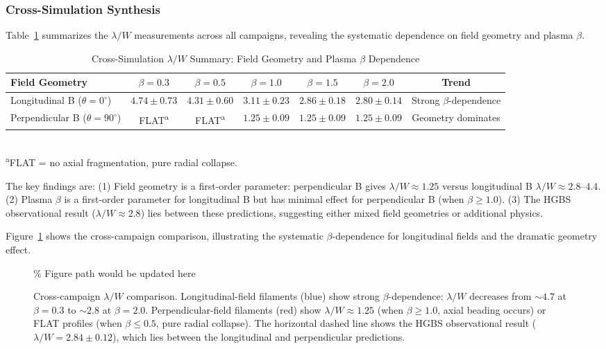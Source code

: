 \documentclass[twoside,twocolumn]{mnras}
\begin{document}
\subsubsection{Cross-Simulation Synthesis}

Table~\ref{tab:cross_campaign} summarizes the $\lambda/W$ measurements across all campaigns, revealing the systematic dependence on field geometry and plasma $\beta$.

\begin{table}
\caption{Cross-Simulation $\lambda/W$ Summary: Field Geometry and Plasma $\beta$ Dependence}
\label{tab:cross_campaign}
\small
\begin{tabular}{lcccccc}
\toprule
Field Geometry & $\beta = 0.3$ & $\beta = 0.5$ & $\beta = 1.0$ & $\beta = 1.5$ & $\beta = 2.0$ & Trend \\
\midrule
Longitudinal B ($\theta = 0^\circ$) & $4.74 \pm 0.73$ & $4.31 \pm 0.60$ & $3.11 \pm 0.23$ & $2.86 \pm 0.18$ & $2.80 \pm 0.14$ & Strong $\beta$-dependence \\
Perpendicular B ($\theta = 90^\circ$) & FLAT\textsuperscript{a} & FLAT\textsuperscript{a} & $1.25 \pm 0.09$ & $1.25 \pm 0.09$ & $1.25 \pm 0.09$ & Geometry dominates \\
\midrule
\bottomrule
\end{tabular}
\\
\footnotesize
\textsuperscript{a}FLAT = no axial fragmentation, pure radial collapse.
\end{table}

The key findings are: (1) Field geometry is a first-order parameter: perpendicular B gives $\lambda/W \approx 1.25$ versus longitudinal B $\lambda/W \approx 2.8$--$4.4$. (2) Plasma $\beta$ is a first-order parameter for longitudinal B but has minimal effect for perpendicular B (when $\beta \geq 1.0$). (3) The HGBS observational result ($\lambda/W \approx 2.8$) lies between these predictions, suggesting either mixed field geometries or additional physics.

Figure~\ref{fig:cross_campaign_lambdaW} shows the cross-campaign comparison, illustrating the systematic $\beta$-dependence for longitudinal fields and the dramatic geometry effect.

\begin{figure}
\% Figure path would be updated here
\caption{Cross-campaign $\lambda/W$ comparison. Longitudinal-field filaments (blue) show strong $\beta$-dependence: $\lambda/W$ decreases from $\sim4.7$ at $\beta = 0.3$ to $\sim2.8$ at $\beta = 2.0$. Perpendicular-field filaments (red) show $\lambda/W \approx 1.25$ (when $\beta \geq 1.0$, axial beading occurs) or FLAT profiles (when $\beta \leq 0.5$, pure radial collapse). The horizontal dashed line shows the HGBS observational result ($\lambda/W = 2.84 \pm 0.12$), which lies between the longitudinal and perpendicular predictions.}
\label{fig:cross_campaign_lambdaW}
\end{figure}
\end{document}
